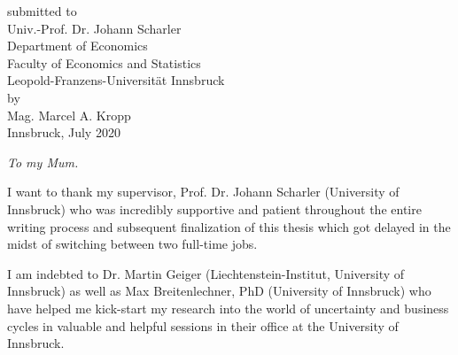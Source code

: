 \documentclass[a4paper,11pt,listof=nochaptergap,oneside,pointednumbers,bibtotoc,bigheadings,liststotoc,hidelinks]{scrbook}
\theoremstyle{mysatz}
\theoremstyle{mydefinition}
\theoremstyle{mytheorem}
\theoremstyle{mybemerkung}
\begin{document}
\begin{titlepage}
\begin{center}
        submitted to\\
        Univ.-Prof. Dr. Johann Scharler \\[10mm]
        Department of Economics\\
        Faculty of Economics and Statistics\\
        Leopold-Franzens-Universität Innsbruck \\[10mm]
        by \\ Mag. Marcel A. Kropp \\[10mm]
        Innsbruck, July 2020
    \end{center}
\end{titlepage}

\restoregeometry

\thispagestyle{empty} %
\null{}
    \begin{flushright}
       \large \textit{To my Mum.}\\
    \end{flushright}
\null


\newpage
\thispagestyle{empty} %


\vspace*{60px}
I want to thank my supervisor, Prof. Dr. Johann Scharler (University of Innsbruck) who was incredibly supportive and patient throughout the entire writing process and subsequent finalization of this thesis which got delayed in the midst of switching between two full-time jobs.

I am indebted to Dr. Martin Geiger (Liechtenstein-Institut, University of Innsbruck) as well as Max Breitenlechner, PhD (University of Innsbruck) who have helped me kick-start my research into the world of uncertainty and business cycles in valuable and helpful sessions in their office at the University of Innsbruck. 
\end{document}
